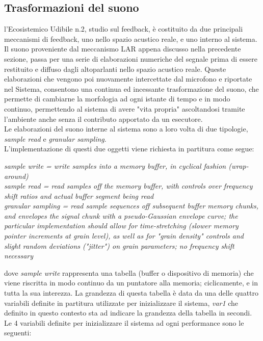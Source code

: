 \subsection{Trasformazioni del suono}
\label{sec:Trasformazioni del suono}

l’Ecosistemico Udibile n.2, studio sul feedback, è costituito
da due principali meccanismi di feedback, uno nello spazio acustico reale,
e uno interno al sistema. \\
Il suono proveniente dal meccanismo LAR appena discusso nella precedente sezione,
passa per una serie di elaborazioni numeriche del segnale prima di essere restituito
e diffuso dagli altoparlanti nello spazio acustico reale. Queste elaborazioni
che vengono poi nuovamente intercettate dal microfono e riportate nel Sistema,
consentono una continua ed incessante trasformazione del suono, che permette
di cambiarne la morfologia ad ogni istante di tempo e in modo continuo, 
permettendo al sistema di avere "vita propria" ascoltandosi tramite l'ambiente
anche senza il contributo apportato da un esecutore. \\
Le elaborazioni del suono interne al sistema sono a loro volta di due tipologie,
\textit{sample read} e \textit{granular sampling}. \\
L'implementazione di questi due oggetti viene richiesta in partitura come segue:

\begin{center}
    \vspace{0.5cm}
    \textit{sample write = write samples into a memory buffer, in cyclical fashion (wrap-around)} \\
    \textit{sample read = read samples off the memory buffer, with controls over frequency shift ratios and actual buffer segment being read} \\
    \textit{granular sampling = read sample sequences off subsequent buffer memory chunks, and envelopes the signal chunk with a pseudo-Gaussian envelope curve; the particular
    implementation should allow for time-stretching (slower memory pointer increments at grain level), as well as for "grain density" controls and slight random deviations ("jitter") on
    grain parameters; no frequency shift necessary} \\
    \vspace{0.5cm}
\end{center}

dove \textit{sample write} rappresenta una tabella (buffer o dispositivo di memoria) 
che viene riscritta in modo continuo da un puntatore alla memoria;
ciclicamente, e in tutta la sua interezza.
La grandezza di questa tabella è data da una delle quattro variabili definite 
in partitura utilizzate per inizializzare il sistema, \textit{var1} che definito in questo contesto sta ad indicare
la grandezza della tabella in secondi.
Le 4 variabili definite per inizializzare il sistema ad ogni performance sono le seguenti:

